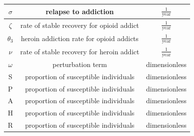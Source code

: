 \documentclass[12pt]{article}
\begin{document}
\begin{center}
\begin{tabular}{|c | c | c | }
\hline

$\sigma$ &  relapse to addiction & $\frac{1}{\text{year}}$  \\

\hline

$\zeta$ &  rate of stable recovery for opioid addict & $\frac{1}{\text{year}}$  \\

\hline

$\theta_3$ &   heroin addiction rate for opioid addicts & $\frac{1}{\text{year}}$\\

\hline

$\nu$ &  rate of stable recovery for heroin addict & $\frac{1}{\text{year}}$  \\

\hline

$\omega$ & perturbation term & \small dimensionless \\

\hline
S & proportion of susceptible individuals & \small dimensionless \\

\hline

P & proportion of susceptible individuals & \small dimensionless \\

\hline
A & proportion of susceptible individuals & \small dimensionless \\

\hline
H & proportion of susceptible individuals & \small dimensionless \\

\hline
R & proportion of susceptible individuals & \small dimensionless \\



 \hline

\end{tabular}

\end{center}
 






\pagebreak



 
\end{document}
